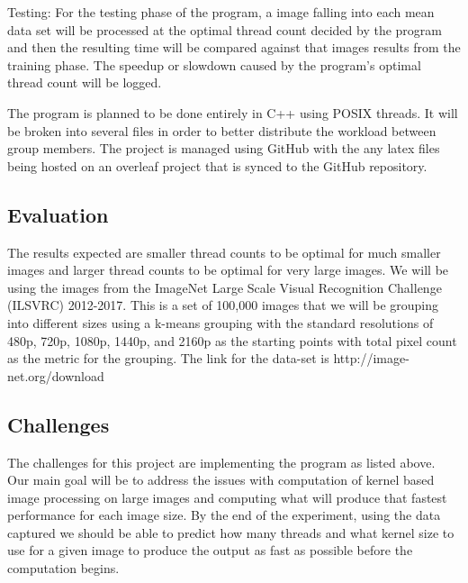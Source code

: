 \documentclass{article}
\begin{document}
Testing: For the testing phase of the program, a image falling into each mean data set will be processed at the optimal thread count decided by the program and then the resulting time will be compared against that images results from the training phase.  The speedup or slowdown caused by the program's optimal thread count will be logged.

The program is planned to be done entirely in C++ using POSIX threads.  It will be broken into several files in order to better distribute the workload between group members.  The project is managed using GitHub with the any latex files being hosted on an overleaf project that is synced to the GitHub repository.

\pagebreak

\subsection{Evaluation}

The results expected are smaller thread counts to be optimal for much smaller images and larger thread counts to be optimal for very large images.  We will be using the images from the  ImageNet Large Scale Visual Recognition Challenge (ILSVRC) 2012-2017.  This is a set of 100,000 images that we will be grouping into different sizes using a k-means grouping with the standard resolutions of 480p, 720p, 1080p, 1440p, and 2160p as the starting points with total pixel count as the metric for the grouping.  The link for the data-set is http://image-net.org/download

\subsection{Challenges}

The challenges for this project are implementing the program as listed above.  Our main goal will be to address the issues with computation of kernel based image processing on large images and computing what will produce that fastest performance for each image size.  By the end of the experiment, using the data captured we should be able to predict how many threads and what kernel size to use for a given image to produce the output as fast as possible before the computation begins.
\end{document}
